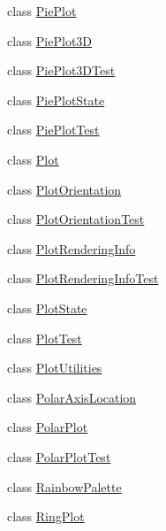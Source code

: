\begin{DoxyCompactItemize}
\item 
class \mbox{\hyperlink{classorg_1_1jfree_1_1chart_1_1plot_1_1_pie_plot}{Pie\+Plot}}
\item 
class \mbox{\hyperlink{classorg_1_1jfree_1_1chart_1_1plot_1_1_pie_plot3_d}{Pie\+Plot3D}}
\item 
class \mbox{\hyperlink{classorg_1_1jfree_1_1chart_1_1plot_1_1_pie_plot3_d_test}{Pie\+Plot3\+D\+Test}}
\item 
class \mbox{\hyperlink{classorg_1_1jfree_1_1chart_1_1plot_1_1_pie_plot_state}{Pie\+Plot\+State}}
\item 
class \mbox{\hyperlink{classorg_1_1jfree_1_1chart_1_1plot_1_1_pie_plot_test}{Pie\+Plot\+Test}}
\item 
class \mbox{\hyperlink{classorg_1_1jfree_1_1chart_1_1plot_1_1_plot}{Plot}}
\item 
class \mbox{\hyperlink{classorg_1_1jfree_1_1chart_1_1plot_1_1_plot_orientation}{Plot\+Orientation}}
\item 
class \mbox{\hyperlink{classorg_1_1jfree_1_1chart_1_1plot_1_1_plot_orientation_test}{Plot\+Orientation\+Test}}
\item 
class \mbox{\hyperlink{classorg_1_1jfree_1_1chart_1_1plot_1_1_plot_rendering_info}{Plot\+Rendering\+Info}}
\item 
class \mbox{\hyperlink{classorg_1_1jfree_1_1chart_1_1plot_1_1_plot_rendering_info_test}{Plot\+Rendering\+Info\+Test}}
\item 
class \mbox{\hyperlink{classorg_1_1jfree_1_1chart_1_1plot_1_1_plot_state}{Plot\+State}}
\item 
class \mbox{\hyperlink{classorg_1_1jfree_1_1chart_1_1plot_1_1_plot_test}{Plot\+Test}}
\item 
class \mbox{\hyperlink{classorg_1_1jfree_1_1chart_1_1plot_1_1_plot_utilities}{Plot\+Utilities}}
\item 
class \mbox{\hyperlink{classorg_1_1jfree_1_1chart_1_1plot_1_1_polar_axis_location}{Polar\+Axis\+Location}}
\item 
class \mbox{\hyperlink{classorg_1_1jfree_1_1chart_1_1plot_1_1_polar_plot}{Polar\+Plot}}
\item 
class \mbox{\hyperlink{classorg_1_1jfree_1_1chart_1_1plot_1_1_polar_plot_test}{Polar\+Plot\+Test}}
\item 
class \mbox{\hyperlink{classorg_1_1jfree_1_1chart_1_1plot_1_1_rainbow_palette}{Rainbow\+Palette}}
\item 
class \mbox{\hyperlink{classorg_1_1jfree_1_1chart_1_1plot_1_1_ring_plot}{Ring\+Plot}}
\item 

\end{DoxyCompactItemize}
